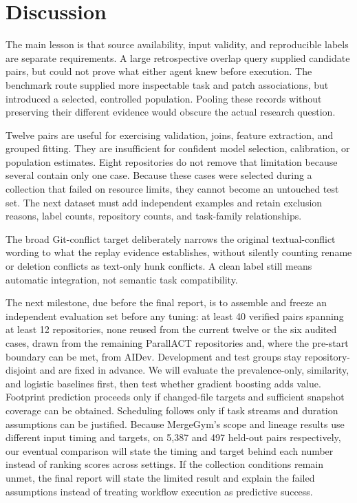 \documentclass[sigconf,authorversion,nonacm]{acmart}
\begin{document}
\section{Discussion}
The main lesson is that source availability, input validity, and reproducible labels are separate requirements. A large retrospective overlap query supplied candidate pairs, but could not prove what either agent knew before execution. The benchmark route supplied more inspectable task and patch associations, but introduced a selected, controlled population. Pooling these records without preserving their different evidence would obscure the actual research question.

Twelve pairs are useful for exercising validation, joins, feature extraction, and grouped fitting. They are insufficient for confident model selection, calibration, or population estimates. Eight repositories do not remove that limitation because several contain only one case. Because these cases were selected during a collection that failed on resource limits, they cannot become an untouched test set. The next dataset must add independent examples and retain exclusion reasons, label counts, repository counts, and task-family relationships.

The broad Git-conflict target deliberately narrows the original textual-conflict wording to what the replay evidence establishes, without silently counting rename or deletion conflicts as text-only hunk conflicts. A clean label still means automatic integration, not semantic task compatibility.

The next milestone, due before the final report, is to assemble and freeze an independent evaluation set before any tuning: at least 40 verified pairs spanning at least 12 repositories, none reused from the current twelve or the six audited cases, drawn from the remaining ParallACT repositories and, where the pre-start boundary can be met, from AIDev. Development and test groups stay repository-disjoint and are fixed in advance. We will evaluate the prevalence-only, similarity, and logistic baselines first, then test whether gradient boosting adds value. Footprint prediction proceeds only if changed-file targets and sufficient snapshot coverage can be obtained. Scheduling follows only if task streams and duration assumptions can be justified. Because MergeGym's scope and lineage results use different input timing and targets, on 5,387 and 497 held-out pairs respectively, our eventual comparison will state the timing and target behind each number instead of ranking scores across settings. If the collection conditions remain unmet, the final report will state the limited result and explain the failed assumptions instead of treating workflow execution as predictive success.
\end{document}
